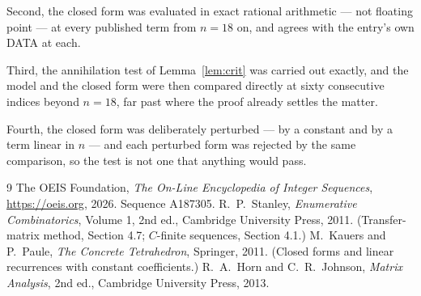 \documentclass[11pt,a4paper]{article}
\theoremstyle{plain}
\theoremstyle{definition}
\begin{document}
Second, the closed form was evaluated in exact rational arithmetic --- not floating point ---
at every published term from $n=18$ on, and agrees with the entry's own DATA at each.

Third, the annihilation test of Lemma~\ref{lem:crit} was carried out exactly, and the model
and the closed form were then compared directly at sixty consecutive indices beyond
$n=18$, far past where the proof already settles the matter.

Fourth, the closed form was deliberately perturbed --- by a constant and by a term linear in
$n$ --- and each perturbed form was rejected by the same comparison, so the test is not one
that anything would pass.

\begin{thebibliography}{9}
 The OEIS Foundation, \emph{The On-Line Encyclopedia of Integer
Sequences}, \url{https://oeis.org}, 2026. Sequence A187305.
 R.~P.~Stanley, \emph{Enumerative Combinatorics}, Volume 1, 2nd ed.,
Cambridge University Press, 2011. (Transfer-matrix method, Section 4.7; $C$-finite sequences,
Section 4.1.)
 M.~Kauers and P.~Paule, \emph{The Concrete Tetrahedron}, Springer, 2011.
(Closed forms and linear recurrences with constant coefficients.)
 R.~A.~Horn and C.~R.~Johnson, \emph{Matrix Analysis}, 2nd ed., Cambridge
University Press, 2013.
\end{thebibliography}
\end{document}
